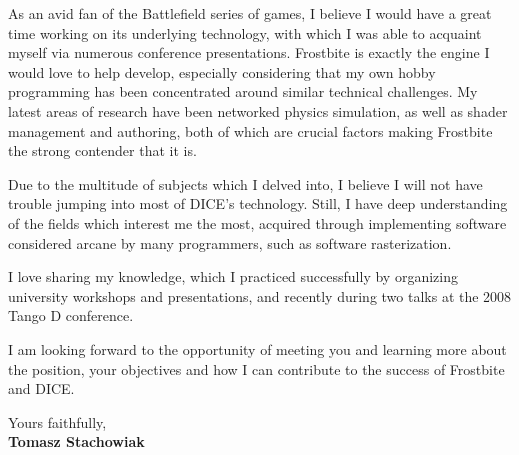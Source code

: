 \documentclass[11pt]{article}
\begin{document}
As an avid fan of the Battlefield series of games, I believe I would have a great time working on its underlying technology, with which I was able to acquaint myself via numerous conference presentations. Frostbite is exactly the engine I would love to help develop, especially considering that my own hobby programming has been concentrated around similar technical challenges. My latest areas of research have been networked physics simulation, as well as shader management and authoring, both of which are crucial factors making Frostbite the strong contender that it is.

Due to the multitude of subjects which I delved into, I believe I will not have trouble jumping into most of DICE's technology. Still, I have deep understanding of the fields which interest me the most, acquired through implementing software considered arcane by many programmers, such as software rasterization.

I love sharing my knowledge, which I practiced successfully by organizing university workshops and presentations, and recently during two talks at the 2008 Tango D conference.

I am looking forward to the opportunity of meeting you and learning more about the position, your objectives and how I can contribute to the success of Frostbite and DICE.
  
Yours faithfully,\\[2em] %
%
{\bfseries Tomasz Stachowiak}
%
\end{document}
